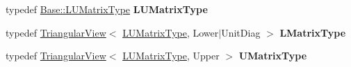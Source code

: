 \begin{DoxyCompactItemize}
\mbox{\label{class_eigen_1_1_super_l_u_adcfd32038df7b0cbf35522a06616c813}} 
typedef \mbox{\hyperlink{class_eigen_1_1_sparse_matrix}{Base\+::\+L\+U\+Matrix\+Type}} {\bfseries L\+U\+Matrix\+Type}
\item 
\mbox{\label{class_eigen_1_1_super_l_u_a134f2bd95f91b4c232a3a1249cea564a}} 
typedef \mbox{\hyperlink{class_eigen_1_1_triangular_view}{Triangular\+View}}$<$ \mbox{\hyperlink{class_eigen_1_1_sparse_matrix}{L\+U\+Matrix\+Type}}, Lower$\vert$Unit\+Diag $>$ {\bfseries L\+Matrix\+Type}
\item 
\mbox{\label{class_eigen_1_1_super_l_u_a27d80c1a4c176c862c7faf194c15d56d}} 
typedef \mbox{\hyperlink{class_eigen_1_1_triangular_view}{Triangular\+View}}$<$ \mbox{\hyperlink{class_eigen_1_1_sparse_matrix}{L\+U\+Matrix\+Type}}, Upper $>$ {\bfseries U\+Matrix\+Type}
\end{DoxyCompactItemize}
